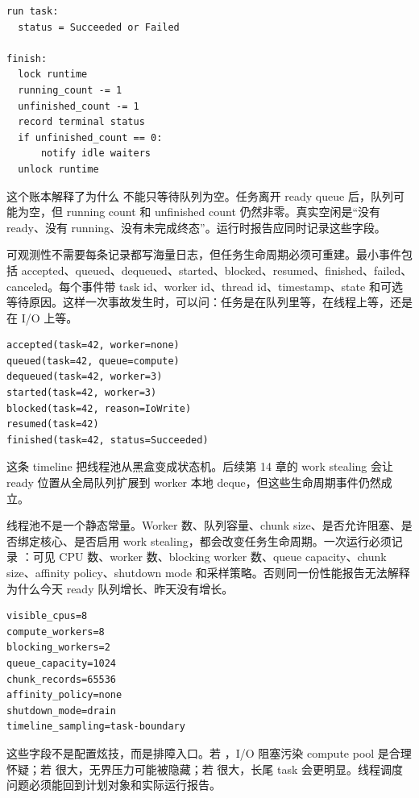 \begin{lstlisting}[numbers=none,caption={finish 的状态变化}]
run task:
  status = Succeeded or Failed

finish:
  lock runtime
  running_count -= 1
  unfinished_count -= 1
  record terminal status
  if unfinished_count == 0:
      notify idle waiters
  unlock runtime
\end{lstlisting}

这个账本解释了为什么  不能只等待队列为空。任务离开 ready queue 后，队列可能为空，但 running count 和 unfinished count 仍然非零。真实空闲是“没有 ready、没有 running、没有未完成终态”。运行时报告应同时记录这些字段。

可观测性不需要每条记录都写海量日志，但任务生命周期必须可重建。最小事件包括 accepted、queued、dequeued、started、blocked、resumed、finished、failed、canceled。每个事件带 task id、worker id、thread id、timestamp、state 和可选等待原因。这样一次事故发生时，可以问：任务是在队列里等，在线程上等，还是在 I/O 上等。

\begin{lstlisting}[numbers=none,caption={任务生命周期事件}]
accepted(task=42, worker=none)
queued(task=42, queue=compute)
dequeued(task=42, worker=3)
started(task=42, worker=3)
blocked(task=42, reason=IoWrite)
resumed(task=42)
finished(task=42, status=Succeeded)
\end{lstlisting}

这条 timeline 把线程池从黑盒变成状态机。后续第 14 章的 work stealing 会让 ready 位置从全局队列扩展到 worker 本地 deque，但这些生命周期事件仍然成立。

线程池不是一个静态常量。Worker 数、队列容量、chunk size、是否允许阻塞、是否绑定核心、是否启用 work stealing，都会改变任务生命周期。一次运行必须记录 ：可见 CPU 数、worker 数、blocking worker 数、queue capacity、chunk size、affinity policy、shutdown mode 和采样策略。否则同一份性能报告无法解释为什么今天 ready 队列增长、昨天没有增长。

\begin{lstlisting}[numbers=none,caption={ThreadPoolPlan 摘要}]
visible_cpus=8
compute_workers=8
blocking_workers=2
queue_capacity=1024
chunk_records=65536
affinity_policy=none
shutdown_mode=drain
timeline_sampling=task-boundary
\end{lstlisting}

这些字段不是配置炫技，而是排障入口。若 ，I/O 阻塞污染 compute pool 是合理怀疑；若  很大，无界压力可能被隐藏；若  很大，长尾 task 会更明显。线程调度问题必须能回到计划对象和实际运行报告。

